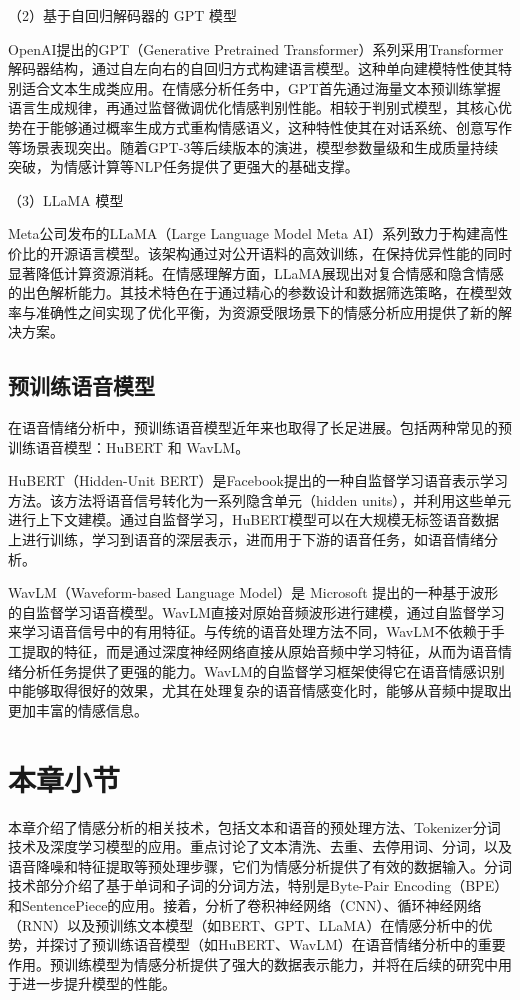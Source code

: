 （2）基于自回归解码器的 GPT 模型

OpenAI提出的GPT（Generative Pretrained Transformer）\cite{Radford_Narasimhan_Salimans_Sutskever}系列采用Transformer解码器结构，通过自左向右的自回归方式构建语言模型。这种单向建模特性使其特别适合文本生成类应用。在情感分析任务中，GPT首先通过海量文本预训练掌握语言生成规律，再通过监督微调优化情感判别性能。相较于判别式模型，其核心优势在于能够通过概率生成方式重构情感语义，这种特性使其在对话系统、创意写作等场景表现突出。随着GPT-3等后续版本的演进，模型参数量级和生成质量持续突破，为情感计算等NLP任务提供了更强大的基础支撑。

（3）LLaMA 模型

Meta公司发布的LLaMA（Large Language Model Meta AI）\cite{Touvron_Lavril_Izacard_Martinet_Lachaux_Lacroix_Roziere_Goyal_Hambro_Azhar_et}系列致力于构建高性价比的开源语言模型。该架构通过对公开语料的高效训练，在保持优异性能的同时显著降低计算资源消耗。在情感理解方面，LLaMA展现出对复合情感和隐含情感的出色解析能力。其技术特色在于通过精心的参数设计和数据筛选策略，在模型效率与准确性之间实现了优化平衡，为资源受限场景下的情感分析应用提供了新的解决方案。

\subsection{预训练语音模型}

在语音情绪分析中，预训练语音模型近年来也取得了长足进展。包括两种常见的预训练语音模型：HuBERT\cite{Hsu_Bolte_Tsai_Lakhotia_Salakhutdinov_Mohamed_2021} 和 WavLM\cite{Chen_2022}。

HuBERT（Hidden-Unit BERT）是Facebook提出的一种自监督学习语音表示学习方法。该方法将语音信号转化为一系列隐含单元（hidden units），并利用这些单元进行上下文建模。通过自监督学习，HuBERT模型可以在大规模无标签语音数据上进行训练，学习到语音的深层表示，进而用于下游的语音任务，如语音情绪分析。

WavLM（Waveform-based Language Model）是 Microsoft 提出的一种基于波形的自监督学习语音模型。WavLM直接对原始音频波形进行建模，通过自监督学习来学习语音信号中的有用特征。与传统的语音处理方法不同，WavLM不依赖于手工提取的特征，而是通过深度神经网络直接从原始音频中学习特征，从而为语音情绪分析任务提供了更强的能力。WavLM的自监督学习框架使得它在语音情感识别中能够取得很好的效果，尤其在处理复杂的语音情感变化时，能够从音频中提取出更加丰富的情感信息。

\section{本章小节}

本章介绍了情感分析的相关技术，包括文本和语音的预处理方法、Tokenizer分词技术及深度学习模型的应用。重点讨论了文本清洗、去重、去停用词、分词，以及语音降噪和特征提取等预处理步骤，它们为情感分析提供了有效的数据输入。分词技术部分介绍了基于单词和子词的分词方法，特别是Byte-Pair Encoding（BPE）和SentencePiece的应用。接着，分析了卷积神经网络（CNN）、循环神经网络（RNN）以及预训练文本模型（如BERT、GPT、LLaMA）在情感分析中的优势，并探讨了预训练语音模型（如HuBERT、WavLM）在语音情绪分析中的重要作用。预训练模型为情感分析提供了强大的数据表示能力，并将在后续的研究中用于进一步提升模型的性能。
